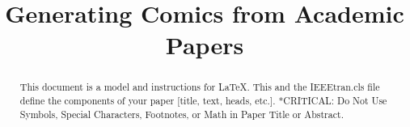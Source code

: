 \documentclass[conference]{IEEEtran}
\begin{document}
\title{Generating Comics from Academic Papers}

\author{
}

\maketitle

\begin{abstract}
This document is a model and instructions for \LaTeX.
This and the IEEEtran.cls file define the components of your paper [title, text, heads, etc.]. *CRITICAL: Do Not Use Symbols, Special Characters, Footnotes,
or Math in Paper Title or Abstract.
\end{abstract}















\clearpage
\appendices

\end{document}
